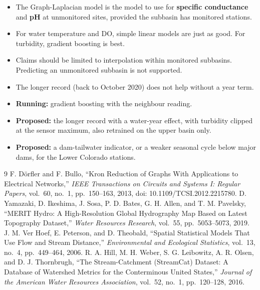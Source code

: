 \documentclass[12pt]{article}
\begin{document}
\begin{itemize}
  \item The Graph-Laplacian model is the model to use for \textbf{specific conductance} and
        \textbf{pH} at unmonitored sites, provided the subbasin has monitored stations.
  \item For water temperature and DO, simple linear models are just as good. For turbidity,
        gradient boosting is best.
  \item Claims should be limited to interpolation within monitored subbasins. Predicting an
        unmonitored subbasin is not supported.
  \item The longer record (back to October 2020) does not help without a year term.
  \item \textbf{Running:} gradient boosting with the neighbour reading.
  \item \textbf{Proposed:} the longer record with a water-year effect, with turbidity clipped at
        the sensor maximum, also retrained on the upper basin only.
  \item \textbf{Proposed:} a dam-tailwater indicator, or a weaker seasonal cycle below major dams,
        for the Lower Colorado stations.
\end{itemize}

{\small
\begin{thebibliography}{9}
 F. D\"orfler and F. Bullo, ``Kron Reduction of Graphs With Applications to
  Electrical Networks,'' \emph{IEEE Transactions on Circuits and Systems I: Regular Papers}, vol.~60,
  no.~1, pp.~150--163, 2013, doi: 10.1109/TCSI.2012.2215780.
 D. Yamazaki, D. Ikeshima, J. Sosa, P. D. Bates, G. H. Allen, and T. M. Pavelsky,
  ``MERIT Hydro: A High-Resolution Global Hydrography Map Based on Latest Topography Dataset,''
  \emph{Water Resources Research}, vol.~55, pp.~5053--5073, 2019.
 J. M. Ver Hoef, E. Peterson, and D. Theobald, ``Spatial Statistical Models That
  Use Flow and Stream Distance,'' \emph{Environmental and Ecological Statistics}, vol.~13, no.~4,
  pp.~449--464, 2006.
 R. A. Hill, M. H. Weber, S. G. Leibowitz, A. R. Olsen, and D. J. Thornbrugh,
  ``The Stream-Catchment (StreamCat) Dataset: A Database of Watershed Metrics for the Conterminous
  United States,'' \emph{Journal of the American Water Resources Association}, vol.~52, no.~1,
  pp.~120--128, 2016.
\end{thebibliography}
}
\end{document}
